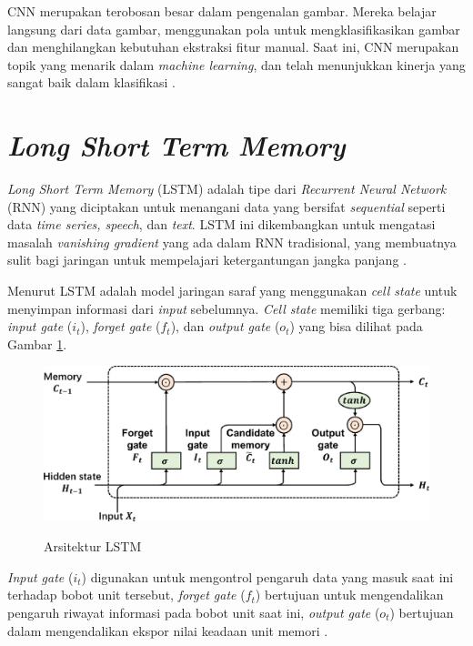 \par CNN merupakan terobosan besar dalam pengenalan gambar. Mereka belajar langsung dari data gambar, menggunakan pola untuk mengklasifikasikan gambar dan menghilangkan kebutuhan ekstraksi fitur manual. Saat ini, CNN merupakan topik yang menarik dalam \textit{machine learning}, dan telah menunjukkan kinerja yang sangat baik dalam klasifikasi \citep{khan2020survey}. 



\section{\textit{Long Short Term Memory}}

\par \textit{Long Short Term Memory} (LSTM) adalah tipe dari \textit{Recurrent Neural Network} (RNN) yang diciptakan untuk menangani data yang bersifat \textit{sequential} seperti data \textit{time series, speech}, dan \textit{text}. LSTM ini dikembangkan untuk mengatasi masalah \textit{vanishing gradient} yang ada dalam RNN tradisional, yang membuatnya sulit bagi jaringan untuk mempelajari ketergantungan jangka panjang \citep{brownlee2017gentle}.

\par Menurut \citep{alom2019state} LSTM adalah model jaringan saraf yang menggunakan \textit{cell state} untuk menyimpan informasi dari \textit{input} sebelumnya. \textit{Cell state} memiliki tiga gerbang: \textit{input gate} ($i_t$), \textit{forget gate} ($f_t$), dan \textit{output gate} ($o_t$) yang bisa dilihat pada Gambar \ref{diagram_lstm}.

\begin{figure}[H]
\centering
{\includegraphics [width=\textwidth]{image/bab2/lstm-architecture.jpg}}
\caption{Arsitektur LSTM \citep{LUO2023107413}}
\label{diagram_lstm}
\end{figure}

\par \textit{Input gate} ($i_t$) digunakan untuk mengontrol pengaruh data yang masuk saat ini terhadap bobot unit tersebut, \textit{forget gate} ($f_t$) bertujuan untuk mengendalikan pengaruh riwayat informasi pada bobot unit saat ini, \textit{output gate} ($o_t$) bertujuan dalam mengendalikan ekspor nilai keadaan unit memori \citep{huang2021fault}.


